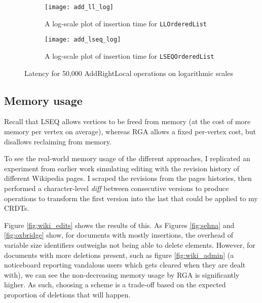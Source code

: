 \documentclass[diss.tex]{subfiles}
\begin{document}
\begin{figure}
\begin{subfigure}{\linewidth}
\centering
\texttt{[image: add\_ll\_log]}
\caption{A log-scale plot of insertion time for \texttt{LLOrderedList}}
\end{subfigure}

\begin{subfigure}{\linewidth}
\centering
\texttt{[image: add\_lseq\_log]}
\caption{A log-scale plot of insertion time for \texttt{LSEQOrderedList}}
\end{subfigure}
%
\caption{Latency for 50,000 AddRightLocal operations on logarithmic scales}
\label{fig:logs}
\end{figure}
%
%
%
%
%
%
%
\subsection{Memory usage}
Recall that LSEQ allows vertices to be freed from memory (at the cost of more memory per vertex on average), whereas RGA allows a fixed per-vertex cost, but disallows reclaiming from memory.

To see the real-world memory usage of the different approaches, I replicated an experiment from earlier work \cite{wiki_edits} simulating editing with the revision history of different Wikipedia pages. I scraped the revisions from the pages histories, then performed a character-level \textit{diff} between consecutive versions to produce operations to transform the first version into the last that could be applied to my CRDTs.

Figure \ref{fig:wiki_edits} shows the results of this. As Figures \ref{fig:sehna} and \ref{fig:oxbridge} show, for documents with mostly insertions, the overhead of variable size identifiers outweighs not being able to delete elements. However, for documents with more deletions present, such as figure \ref{fig:wiki_admin} (a noticeboard reporting vandalous users which gets cleared when they are dealt with), we can see the non-decreasing memory usage by RGA is significantly higher. As such, choosing a scheme is a trade-off based on the expected proportion of deletions that will happen.
\end{document}
